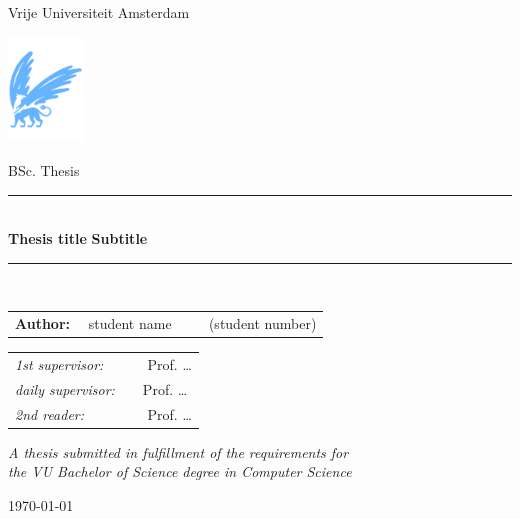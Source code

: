 \thispagestyle{empty}

\begin{center}

Vrije Universiteit Amsterdam

\vspace{1mm}

\includegraphics[height=28mm]{vu-griffioen.pdf}

\vspace{1.5cm}

{\Large BSc. Thesis}

\vspace*{1.5cm}

\rule{.9\linewidth}{.6pt}\\[0.4cm]
{\huge \bfseries Thesis title}
{\huge \bfseries Subtitle}\vspace{0.4cm}
\rule{.9\linewidth}{.6pt}\\[1.5cm]

\vspace*{2mm}

{\Large
\begin{tabular}{l}
{\bf Author:} ~~student name ~~~~ (student number)
\end{tabular}
}

\vspace*{1.5cm}

\begin{tabular}{ll}
{\it 1st supervisor:}   & ~~ Prof. \ldots \\
{\it daily supervisor:} & ~~Prof. \ldots \\
{\it 2nd reader:}       & ~~ Prof. \ldots 
\end{tabular}

\vspace*{2cm}

\textit{A thesis submitted in fulfillment of the requirements for\\ the VU Bachelor
of Science degree in Computer Science }

\vspace*{1cm}

\today\\[4cm] %

\end{center}

\newpage